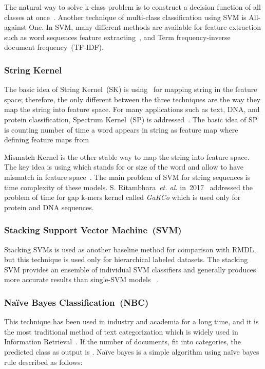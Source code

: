 \documentclass[sigconf, final]{acmart}
\begin{document}
The natural way to solve k-class problem is to construct a decision function of all  classes at once~\cite{chen2016turning,weston1998multi}.  
Another technique of multi-class classification using SVM is All-against-One. In SVM, many different methods are available for feature extraction such as word sequences feature extracting~\cite{zhang2008text}, and Term frequency-inverse document frequency~(TF-IDF).
\subsubsection*{String Kernel}\label{String_kernel}
The basic idea of String Kernel~(SK) is using~ for mapping string in the feature space; therefore, the only different between the three techniques are the way they map the string into feature space. For many applications such as text, DNA, and protein classification, Spectrum Kernel~(SP) is addressed~\cite{leslie2002spectrum,eskin2002mismatch}. The basic idea of SP is counting number of time a word appears in string   as feature map where defining feature maps from 

 Mismatch Kernel is the other stable way to map the string into feature space. The key idea is using  which stands for  or size of the word and allow to have~ mismatch in feature space~\cite{leslie2004mismatch}. The main problem of SVM for string sequences is time complexity of these models. S. Ritambhara~\textit{et. al.} in~2017~\cite{singh2017gakco} addressed the problem of time for gap k-mers kernel called \textit{GaKCo} which is used only for protein and DNA sequences.
 

\subsubsection{Stacking Support Vector Machine~(SVM)}
Stacking SVMs is used as another baseline method for comparison with RMDL, but this technique is used only for hierarchical labeled datasets. The stacking SVM provides an ensemble of individual SVM classifiers and generally produces more accurate results than single-SVM models  ~\cite{sun2001hierarchical,sebastiani2002machine}.

\subsubsection{Na\"{i}ve Bayes Classification~(NBC)}\label{me_NB}
This technique has been used in industry and academia for a long time, and it is the most traditional method of text categorization which is widely used in Information Retrieval~\cite{manning2008introduction}. If the number of  documents, fit into  categories, the predicted class as output is . Na\"{i}ve bayes is a simple algorithm using na\"{i}ve bayes rule described  as follows:
\end{document}
